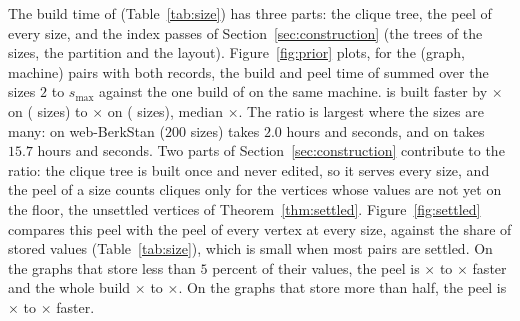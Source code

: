 The build time of \chainidx (Table~\ref{tab:size}) has three parts: the clique tree, the peel of every size, and the index passes of Section~\ref{sec:construction} (the trees of the sizes, the partition and the layout).
%
Figure~\ref{fig:prior} plots, for the \priorgraphs{} (graph, machine) pairs with both records, the build and peel time of \cnd summed over the sizes $2$ to $s_{\max}$ against the one build of \chainidx on the same machine.
%
\chainidx is built faster by \priormin$\times$ on \priormingraph{} (\priorminsizes{} sizes) to \priormax$\times$ on \priormaxgraph{} (\priormaxsizes{} sizes), median \priormedian$\times$.
%
The ratio is largest where the sizes are many: on \textsf{web-BerkStan} ($200$ sizes) \cnd takes $2.0$ hours and \chainidx \buildberkstan{} seconds, and on \webuk{} \cnd takes $15.7$ hours and \chainidx \buildwebuk{} seconds.
%
Two parts of Section~\ref{sec:construction} contribute to the ratio: the clique tree is built once and never edited, so it serves every size, and the peel of a size counts cliques only for the vertices whose values are not yet on the floor, the unsettled vertices of Theorem~\ref{thm:settled}.
%
Figure~\ref{fig:settled} compares this peel with the peel of every vertex at every size, against the share of stored values (Table~\ref{tab:size}), which is small when most pairs are settled.
%
On the \lowgraphs{} graphs that store less than $5$ percent of their values, the peel is \lowpeelmin$\times$ to \lowpeelmax$\times$ faster and the whole build \lowbuildmin$\times$ to \lowbuildmax$\times$.
%
On the \highgraphs{} graphs that store more than half, the peel is \highpeelmin$\times$ to \highpeelmax$\times$ faster.

